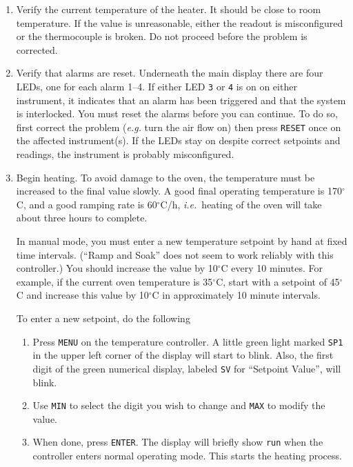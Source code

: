 {\begin{enumerate}
\item Verify the current temperature of the heater. It should be
  close to room temperature. If the value is unreasonable, either
  the readout is misconfigured or the thermocouple is broken.
  Do not proceed before the problem is corrected.

\item Verify that alarms are reset. 
  Underneath the main display there are four LEDs, one for each
  alarm 1--4. If either LED {\tt 3} or {\tt 4} is on on either
  instrument, it indicates that an alarm has been triggered and
  that the system is interlocked. You must reset the alarms before
  you can continue. To do so, first correct
  the problem ({\it e.g.}\/ turn the air flow on) then press {\tt RESET}
  once on the affected instrument(s). If the LEDs stay on despite
  correct setpoints and readings, the instrument is probably misconfigured.

\item Begin heating. 
  To avoid damage to the oven, the temperature must be increased
  to the final value slowly. A good final operating temperature is
  170$^\circ$C, and a good ramping rate is 60$^\circ$C/h, {\it i.e.\/}\
  heating of the oven will take about three hours to complete.
  
  In manual mode, you must enter a new temperature setpoint by hand
  at fixed time intervals. (``Ramp and Soak'' does not seem to work reliably
  with this controller.) You should increase the  value by
  10$^\circ$C every 10 minutes. For example, if the current oven temperature
  is 35$^\circ$C, start with a setpoint of 45$^\circ$C and increase this
  value by 10$^\circ$C in approximately 10 minute intervals.

  To enter a new setpoint, do the following
  \begin{enumerate}
   \item Press {\tt MENU} on the temperature controller. 
         A little green light marked {\tt SP1} in the upper left corner of 
         the display will start to blink. Also, the first digit of
         the green numerical display, labeled {\tt SV} for ``Setpoint
         Value'', will blink.
   \item Use {\tt MIN} to select the digit you wish to change and {\tt MAX}
         to modify the value.
   \item When done, press {\tt ENTER}. The display will briefly show
         {\tt run} when the controller enters normal operating mode.
         This starts the heating process.
  \end{enumerate}


\end{enumerate}}
